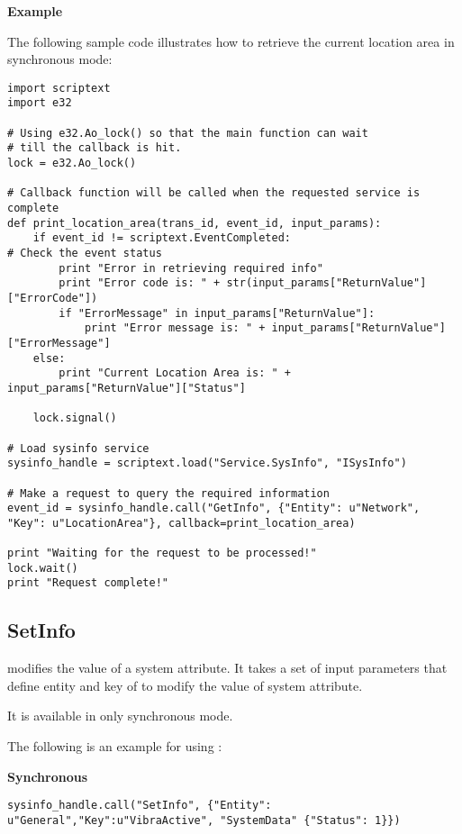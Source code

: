 {\bf Example} \break

The following sample code illustrates how to retrieve the current location area in synchronous mode:

\begin{verbatim}
import scriptext
import e32

# Using e32.Ao_lock() so that the main function can wait 
# till the callback is hit.
lock = e32.Ao_lock()

# Callback function will be called when the requested service is complete
def print_location_area(trans_id, event_id, input_params):
    if event_id != scriptext.EventCompleted:   
# Check the event status
        print "Error in retrieving required info"
        print "Error code is: " + str(input_params["ReturnValue"]["ErrorCode"])
        if "ErrorMessage" in input_params["ReturnValue"]:
            print "Error message is: " + input_params["ReturnValue"]["ErrorMessage"]
    else:
        print "Current Location Area is: " + input_params["ReturnValue"]["Status"]

    lock.signal()

# Load sysinfo service
sysinfo_handle = scriptext.load("Service.SysInfo", "ISysInfo")

# Make a request to query the required information
event_id = sysinfo_handle.call("GetInfo", {"Entity": u"Network", "Key": u"LocationArea"}, callback=print_location_area)

print "Waiting for the request to be processed!"
lock.wait()
print "Request complete!"
\end{verbatim}

\subsection{SetInfo}
\label{subsec:sysinfosetinfo}

 modifies the value of a system attribute. It takes a set of input parameters that define entity and key of  to modify the value of system attribute. \break

It is available in only synchronous mode.

The following is an example for using :

{\bf Synchronous} \break

\begin{verbatim}
sysinfo_handle.call("SetInfo", {"Entity": u"General","Key":u"VibraActive", "SystemData" {"Status": 1}}) 
\end{verbatim}

